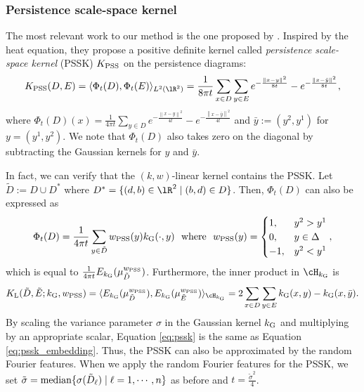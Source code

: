 \documentclass{article}
\newcommand{\DD}{{\Delta}}
\newcommand{\median}{{\rm median}}
\providecommand{\norm}[1]{\left\lVert#1\right\rVert}
\providecommand{\inn}[2]{\langle #1, #2 \rangle}
\begin{document}
\subsubsection{Persistence scale-space kernel}
\label{subsubsec:pssk}
The most relevant work to our method is the one proposed by \cite{RHBK15}.
Inspired by the heat equation, they propose a positive definite kernel called {\em persistence scale-space kernel} (PSSK) $K_{{\rm PSS}}$ on the persistence diagrams:
\begin{align}
K_{{\rm PSS}}(D,E)=\inn{\Phi_{t}(D)}{\Phi_{t}(E)}_{L^{2}(\lR^{2})} =\frac{1}{8 \pi t} \sum_{x \in D} \sum_{y \in E}  e^{-\frac{ \norm{x-y}^{2} }{8 t}} - e^{-\frac{ \norm{x-\bar{y}}^{2} }{8 t}}, \label{eq:pssk}
\end{align}
where $\Phi_{t}(D)(x)=\frac{1}{4\pi t} \sum_{y \in D} e^{-\frac{\norm{x-y}^{2}}{4 t}} - e^{-\frac{\norm{x-\bar{y}}^{2}}{4 t}}$ and $\bar{y}:=(y^{2},y^{1})$ for $y=(y^{1},y^{2})$.
We note that $\Phi_{t}(D)$ also takes zero on the diagonal by subtracting the Gaussian kernels for $y$ and $\bar{y}$.  

In fact, we can verify that the $(k,w)$-linear kernel contains the PSSK.
Let $\tilde{D}:=D \cup D^{*}$ where $D^{*}=\{(d,b) \in \lR^{2} \mid (b,d) \in D\}$.
Then, $\Phi_{t}(D)$ can also be expressed as 
\begin{align*}
\Phi_{t}(D)=\frac{1}{4\pi t}\sum_{y \in \tilde{D}} w_{{\rm PSS}}(y) k_{{\rm G}}(\cdot,y) \ \mbox{ where }  \ 
w_{{\rm PSS}}(y)=
\begin{cases}
1, & y^{2}>y^{1} \\
0, & y \in \DD \\
-1, & y^{2} <y^{1}
\end{cases},
\end{align*}
which is equal to $\frac{1}{4\pi t} E_{k_{{\rm G}}}(\mu^{w_{{\rm PSS}}}_{\tilde{D}})$.
Furthermore, the inner product in $\cH_{k_{{\rm G}}}$ is
\begin{align}
K_{{\rm L}}(\tilde{D},\tilde{E};k_{{\rm G}},w_{{\rm PSS}})=\inn{E_{k_{{\rm G}}}(\mu^{w_{{\rm PSS}}}_{\tilde{D}})}{E_{k_{{\rm G}}}(\mu^{w_{{\rm PSS}}}_{\tilde{E}})}_{\cH_{k_{{\rm G}}}}=2\sum_{x \in D} \sum_{y \in E}  k_{{\rm G}}(x,y)-k_{{\rm G}}(x,\bar{y}). \label{eq:pssk_embedding}
\end{align}
By scaling the variance parameter $\sigma$ in the Gaussian kernel $k_{{\rm G}}$ and multiplying by an appropriate scalar, Equation \eqref{eq:pssk} is the same as Equation \eqref{eq:pssk_embedding}.
Thus, the PSSK can also be approximated by the random Fourier features. When we apply the random Fourier features for the PSSK, we set $\tilde{\sigma}=\median\{\sigma(\tilde{D}_{\ell}) \mid \ell =1,\cdots, n\}$ as before and $t=\frac{\tilde{\sigma}^{2}}{4}$.
\end{document}
